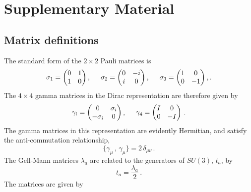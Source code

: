 \chapter{Supplementary Material}
\section{Matrix definitions}\label{app:GellMann}
The standard form of the $2\times 2$ Pauli matrices is
%
\begin{equation*}
\sigma_1 = \begin{pmatrix}
0 & 1\\
1 & 0
\end{pmatrix},
\hspace{0.5cm}
\sigma_2 = \begin{pmatrix}
0 & -i\\
i & 0
\end{pmatrix},
\hspace{0.5cm}
\sigma_3 = \begin{pmatrix}
1 & 0\\
0 & -1
\end{pmatrix}\\, .
\end{equation*}
%
The $4\times 4$ gamma matrices in the Dirac representation are therefore given by
%
\begin{align*}
\gamma_i = \begin{pmatrix}
0 & \sigma_i\\
-\sigma_i & 0
\end{pmatrix},
\hspace{0.5cm}
\gamma_4 = \begin{pmatrix}
I & 0\\
0 & -I
\end{pmatrix}\, .
\end{align*} 
%
The gamma matrices in this representation are evidently Hermitian, and satisfy the anti-commutation relationship,
%
\begin{equation*}
\lbrace \gamma_\mu\, ,\, \gamma_\mu \rbrace = 2\,\delta_{\mu\nu}\, .
\end{equation*}
%
The Gell-Mann matrices $\lambda_a$ are related to the generators of $SU(3)$, $t_a$, by~\cite{peskin2018introduction}
%
\begin{equation}
t_a = \frac{\lambda_a}{2}\, .
\end{equation}
%
The matrices are given by
%
